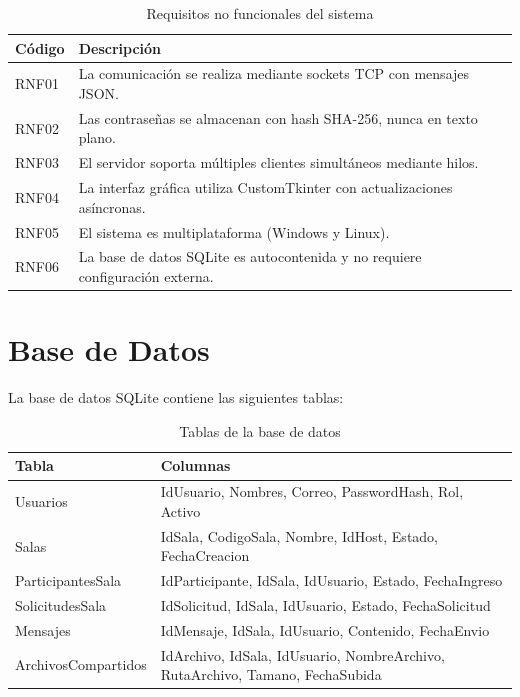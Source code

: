 \documentclass[12pt,a4paper]{article}
\begin{document}
\begin{table}[H]
\centering
\begin{tabular}{p{2cm}p{10cm}}
\toprule
\textbf{C\'odigo} & \textbf{Descripci\'on} \\
\midrule
RNF01 & La comunicaci\'on se realiza mediante sockets TCP con mensajes JSON. \\
RNF02 & Las contrase\~nas se almacenan con hash SHA-256, nunca en texto plano. \\
RNF03 & El servidor soporta m\'ultiples clientes simult\'aneos mediante hilos. \\
RNF04 & La interfaz gr\'afica utiliza CustomTkinter con actualizaciones as\'incronas. \\
RNF05 & El sistema es multiplataforma (Windows y Linux). \\
RNF06 & La base de datos SQLite es autocontenida y no requiere configuraci\'on externa. \\
\bottomrule
\end{tabular}
\caption{Requisitos no funcionales del sistema}
\end{table}



\section{Base de Datos}

La base de datos SQLite contiene las siguientes tablas:

\begin{table}[H]
    \centering
    \begin{tabular}{p{3.5cm}p{10cm}}
    \toprule
    \textbf{Tabla} & \textbf{Columnas} \\
    \midrule
    Usuarios          & IdUsuario, Nombres, Correo, PasswordHash, Rol, Activo \\
    Salas             & IdSala, CodigoSala, Nombre, IdHost, Estado, FechaCreacion \\
    ParticipantesSala & IdParticipante, IdSala, IdUsuario, Estado, FechaIngreso \\
    SolicitudesSala   & IdSolicitud, IdSala, IdUsuario, Estado, FechaSolicitud \\
    Mensajes          & IdMensaje, IdSala, IdUsuario, Contenido, FechaEnvio \\
    ArchivosCompartidos & IdArchivo, IdSala, IdUsuario, NombreArchivo, RutaArchivo, Tamano, FechaSubida \\
    \bottomrule
    \end{tabular}
    \caption{Tablas de la base de datos}
\end{table}
\end{document}
